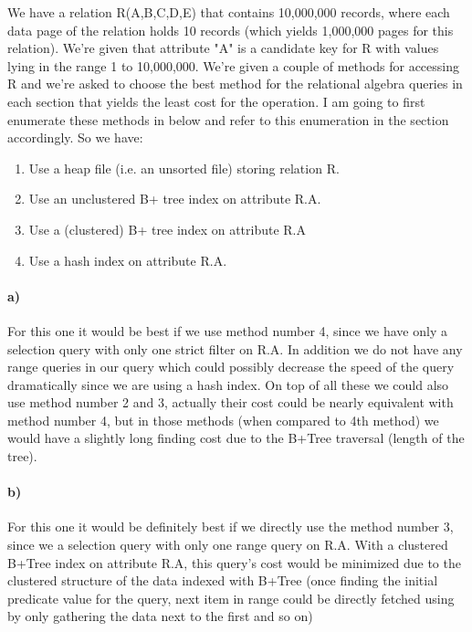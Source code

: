 \documentclass[a4paper,12pt]{article}
\begin{document}
We have a relation R(A,B,C,D,E) that contains 10,000,000 records, where each data page of the relation holds 10 records (which yields 1,000,000 pages for this relation). We're given that attribute "A" is a candidate key for R with values lying in the range 1 to 10,000,000. We're given a couple of methods for accessing R and we're asked to choose the best method for the relational algebra queries in each section that yields the least cost for the operation. I am going to first enumerate these methods in below and refer to this enumeration in the section accordingly. So we have:

\begin{enumerate}
    \item Use a heap file (i.e. an unsorted file) storing relation R.
    \item Use an unclustered B+ tree index on attribute R.A.
    \item Use a (clustered) B+ tree index on attribute R.A
    \item Use a hash index on attribute R.A.
\end{enumerate}

\paragraph{a)} For this one it would be best if we use method number 4, since we have only a selection query with only one strict filter on R.A. In addition we do not have any range queries in our query which could possibly decrease the speed of the query dramatically since we are using a hash index. On top of all these we could also use method number 2 and 3, actually their cost could be nearly equivalent with method number 4, but in those methods (when compared to 4th method) we would have a slightly long finding cost due to the B+Tree traversal (length of the tree).

\paragraph{b)} For this one it would be definitely best if we directly use the method number 3, since we a selection query with only one range query on R.A. With a clustered B+Tree index on attribute R.A, this query's cost would be minimized due to the clustered structure of the data indexed with B+Tree (once finding the initial predicate value for the query, next item in range could be directly fetched using by only gathering the data next to the first and so on)
\end{document}
